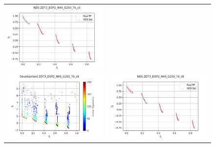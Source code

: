 \begin{figure}[H]
\begin{tabular}{c c}
    \includegraphics[scale=0.5]{figures/ZDT3_EOP2_N40_G250_T6/s5_nds.png}\\
    \includegraphics[scale=0.5]{figures/ZDT3_EOP2_N40_G250_T6/s8_dev.png} &
    \includegraphics[scale=0.5]{figures/ZDT3_EOP2_N40_G250_T6/s8_nds.png}\\

\end{tabular}
\end{figure}
